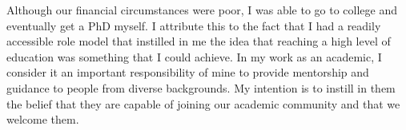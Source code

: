 \documentclass{article}
\begin{document}
Although our financial circumstances were poor, I was able to go to college and eventually get a PhD myself. I attribute this to the fact that I had a readily accessible role model that instilled in me the idea that reaching a high level of education was something that I could achieve. In my work as an academic, I consider it an important responsibility of mine to provide mentorship and guidance to people from diverse backgrounds. My intention is to instill in them the belief that they are capable of joining our academic community and that we welcome them.
\end{document}

